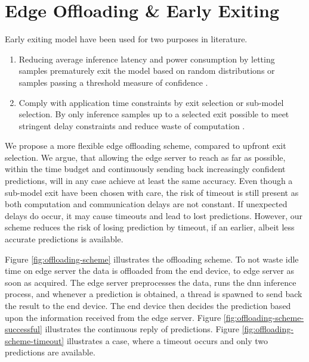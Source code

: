 \chapter{Edge Offloading \& Early Exiting}

Early exiting model have been used for two purposes in literature.

\begin{enumerate}
	\item Reducing average inference latency and power consumption by letting samples prematurely exit the model based on random distributions \cite{bibid} or samples passing a threshold measure of confidence \cite{teerapittayanon_branchynet:_2016}.
	\item Comply with application time constraints by exit selection or sub-model selection. By only inference samples up to a selected exit possible to meet stringent delay constraints and reduce waste of computation \cite{li_edge_2018}. 
\end{enumerate} 

We propose a more flexible edge offloading scheme, compared to upfront exit selection. We argue, that allowing the edge server to reach as far as possible, within the time budget and continuously sending back increasingly confident predictions, will in any case achieve at least the same accuracy. Even though a sub-model exit have been chosen with care, the risk of timeout is still present as both computation and communication delays are not constant. If unexpected delays do occur, it may cause timeouts and lead to lost predictions. However, our scheme reduces the risk of losing prediction by timeout, if an earlier, albeit less accurate predictions is available. 

Figure \ref{fig:offloading-scheme} illustrates the offloading scheme. To not waste idle time on edge server the data is offloaded from the end device, to edge server as soon as acquired. The edge server preprocesses the data, runs the \gls{dnn} inference process, and whenever a prediction is obtained, a thread is spawned to send back the result to the end device. The end device then decides the prediction based upon the information received from the edge server. Figure \ref{fig:offloading-scheme-successful} illustrates the continuous reply of predictions. Figure \ref{fig:offloading-scheme-timeout} illustrates a case, where a timeout occurs and only two predictions are available. 

